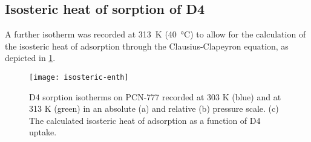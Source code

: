 \subsection{Isosteric heat of sorption of D4}\label{isosteric-heat-of-sorption-of-d4}

A further isotherm was recorded at \SI{313}{\kelvin} (\SI{40}{\degreeCelsius})
to allow for the calculation of the isosteric heat of adsorption through the
Clausius-Clapeyron equation, as depicted in \cref{fig:isosteric-enth}.

\begin{figure}[H]
    \centering
    \texttt{[image: isosteric-enth]}
    \caption{%
        D4 sorption isotherms on PCN-777 recorded at 303 K (blue)
        and at 313 K (green) in an absolute (a) and relative (b) pressure scale.
        (c) The calculated isosteric heat of adsorption as a function of D4
        uptake.
    }\label{fig:isosteric-enth}
\end{figure}
